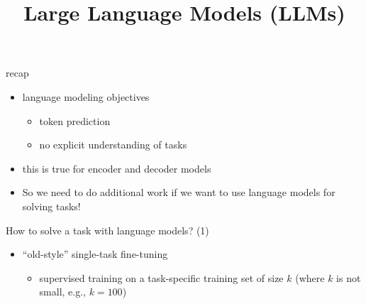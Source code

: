 



\newcommand{\learninggoals}{
\item comprehend the different subtleties in the space of fine-tuning and prompting}

\def\myblue#1{\textcolor{texblue}{#1}}

\title{Large Language Models (LLMs)}
\date{}




\begin{frame}{recap}

\vfill

\begin{itemize}
    \item language modeling objectives
        \begin{itemize}
            \item token prediction
            \item no explicit understanding of tasks
        \end{itemize}
    \item this is true for encoder and decoder models
    \item So we need to do additional work if we want
        to use language models for solving tasks!
\end{itemize}

\vfill

\end{frame}


\begin{frame}{How to solve a task with language models? (1)}

\vfill

\begin{itemize}
    \item ``old-style'' single-task fine-tuning 
        \begin{itemize}
            \item supervised training on a task-specific
        training set of size $k$ (where $k$ is not small,
        e.g., $k=100$)
        \end{itemize}
\end{itemize}

\vfill

\end{frame}

